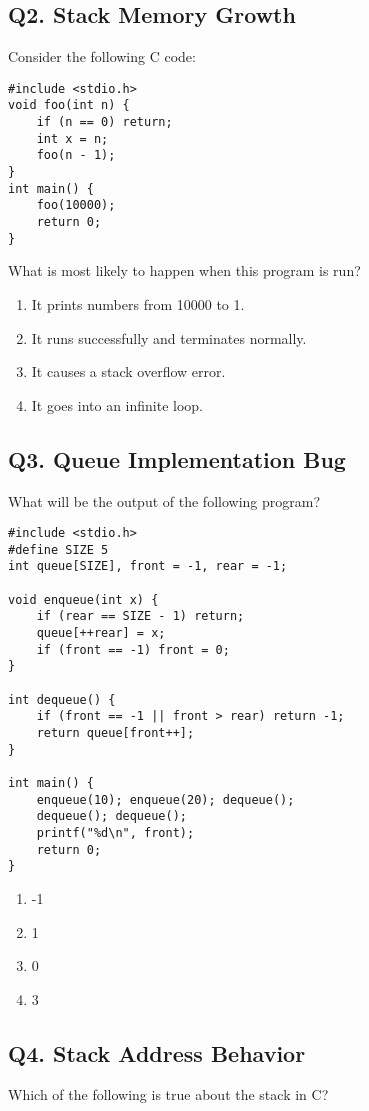 \subsection*{Q2. Stack Memory Growth}
Consider the following C code:

\begin{lstlisting}
#include <stdio.h>
void foo(int n) {
    if (n == 0) return;
    int x = n;
    foo(n - 1);
}
int main() {
    foo(10000);
    return 0;
}
\end{lstlisting}

What is most likely to happen when this program is run?

\begin{enumerate}[label=(\alph*)]
    \item It prints numbers from 10000 to 1.
    \item It runs successfully and terminates normally.
    \item It causes a stack overflow error.
    \item It goes into an infinite loop.
\end{enumerate}

\newpage
\subsection*{Q3. Queue Implementation Bug}
What will be the output of the following program?

\begin{lstlisting}
#include <stdio.h>
#define SIZE 5
int queue[SIZE], front = -1, rear = -1;

void enqueue(int x) {
    if (rear == SIZE - 1) return;
    queue[++rear] = x;
    if (front == -1) front = 0;
}

int dequeue() {
    if (front == -1 || front > rear) return -1;
    return queue[front++];
}

int main() {
    enqueue(10); enqueue(20); dequeue();
    dequeue(); dequeue();
    printf("%d\n", front);
    return 0;
}
\end{lstlisting}

\begin{enumerate}[label=(\alph*)]
    \item -1
    \item 1
    \item 0
    \item 3
\end{enumerate}

\subsection*{Q4. Stack Address Behavior}
Which of the following is true about the stack in C?

